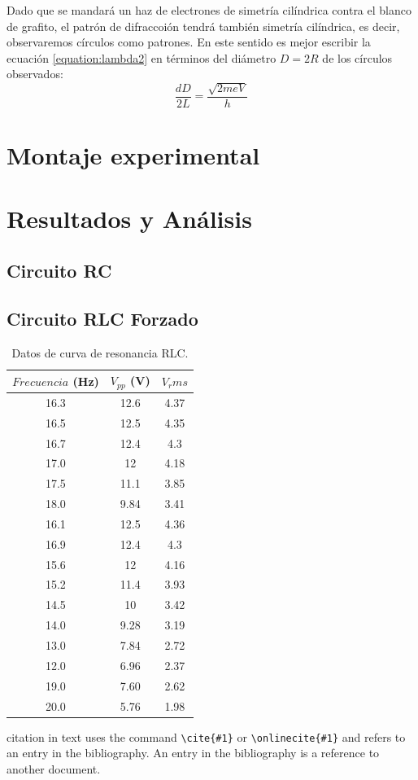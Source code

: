 \documentclass[%
 reprint,
 amsmath,amssymb,
 aps,
]{revtex4-1}
\begin{document}
Dado que se mandará un haz de electrones de simetría cilíndrica contra el blanco de grafito, el patrón de difraccoión tendrá también simetría cilíndrica, es decir, observaremos círculos como patrones. En este sentido es mejor escribir la ecuación \ref{equation:lambda2} en términos del diámetro $D = 2R$ de los círculos observados:\\

 \begin{equation}
\frac{dD}{2L} = \frac{\sqrt{2meV}}{h}
\label{equation:final}
\end{equation} 



\section{\label{sec:level1}Montaje experimental}


\section{\label{sec:level1}Resultados y An\'alisis}

\subsection{\label{sec:level2}Circuito RC}


\subsection{\label{sec:level2}Circuito RLC Forzado}


\begin{table}[h!]
\centering
 \begin{tabular}{|c|c|c|} 
 \hline
 $Frecuencia$ (Hz) & $V_{pp}$ (V) & $V_rms$ \\ [0.5ex] 
 \hline\hline
16.3 &		12.6 &		4.37\\
16.5 &		12.5 &		4.35\\
16.7 &		12.4 &		4.3\\
17.0 &		12 &		4.18\\
17.5 &		11.1 &		3.85\\
18.0 &		9.84 &		3.41\\
16.1 &		12.5 &		4.36\\
16.9 &		12.4 &		4.3\\
15.6 &		12 &		4.16\\
15.2 &		11.4 &		3.93\\
14.5 &		10 &		3.42\\
14.0 &		9.28 &		3.19\\
13.0 &		7.84 &		2.72\\
12.0 &		6.96 &		2.37\\
19.0 &		7.60 &		2.62\\
20.0 &		5.76 &		1.98\\
[1ex] 
 \hline
 \end{tabular}
 \caption{Datos de curva de resonancia RLC.}
 \label{table:resonancia}
\end{table}
 citation in text uses the command \verb+\cite{#1}+ or
\verb+\onlinecite{#1}+ and refers to an entry in the bibliography. 
An entry in the bibliography is a reference to another document.
\end{document}
